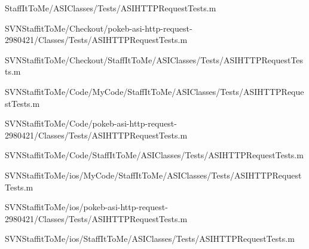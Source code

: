 \begin{DoxyCompactItemize}
\-Staff\-It\-To\-Me/\-A\-S\-I\-Classes/\-Tests/\-A\-S\-I\-H\-T\-T\-P\-Request\-Tests.\-m\item 
\-S\-V\-N\-Staffit\-To\-Me/\-Checkout/pokeb-\/asi-\/http-\/request-\/2980421/\-Classes/\-Tests/\-A\-S\-I\-H\-T\-T\-P\-Request\-Tests.\-m\item 
\-S\-V\-N\-Staffit\-To\-Me/\-Checkout/\-Staff\-It\-To\-Me/\-A\-S\-I\-Classes/\-Tests/\-A\-S\-I\-H\-T\-T\-P\-Request\-Tests.\-m\item 
\-S\-V\-N\-Staffit\-To\-Me/\-Code/\-My\-Code/\-Staff\-It\-To\-Me/\-A\-S\-I\-Classes/\-Tests/\-A\-S\-I\-H\-T\-T\-P\-Request\-Tests.\-m\item 
\-S\-V\-N\-Staffit\-To\-Me/\-Code/pokeb-\/asi-\/http-\/request-\/2980421/\-Classes/\-Tests/\-A\-S\-I\-H\-T\-T\-P\-Request\-Tests.\-m\item 
\-S\-V\-N\-Staffit\-To\-Me/\-Code/\-Staff\-It\-To\-Me/\-A\-S\-I\-Classes/\-Tests/\-A\-S\-I\-H\-T\-T\-P\-Request\-Tests.\-m\item 
\-S\-V\-N\-Staffit\-To\-Me/ios/\-My\-Code/\-Staff\-It\-To\-Me/\-A\-S\-I\-Classes/\-Tests/\-A\-S\-I\-H\-T\-T\-P\-Request\-Tests.\-m\item 
\-S\-V\-N\-Staffit\-To\-Me/ios/pokeb-\/asi-\/http-\/request-\/2980421/\-Classes/\-Tests/\-A\-S\-I\-H\-T\-T\-P\-Request\-Tests.\-m\item 
\-S\-V\-N\-Staffit\-To\-Me/ios/\-Staff\-It\-To\-Me/\-A\-S\-I\-Classes/\-Tests/\-A\-S\-I\-H\-T\-T\-P\-Request\-Tests.\-m\end{DoxyCompactItemize}
